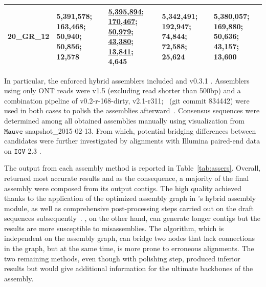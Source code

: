 \begin{landscape}
\begin{table}[!hpt]
\begin{tabular}{cp{4cm}p{4cm}p{4cm}p{4cm}}
20\_GR\_12              & \cellcolor{Gray}\textbf{5,391,578}; \textbf{163,468}; \textbf{50,940}; 50,856; 12,578  & \underline{\textbf{5,395,894}}; \underline{\textbf{170,467}}; \underline{\textbf{50,979}}; \underline{\textbf{43,380}}; \underline{\textbf{13,841}}; 4,645     & \cellcolor{Gray}5,342,491; \textbf{192,947}; 74,844; 72,588; 25,624    & \textbf{5,380,057}; \textbf{169,880}; \textbf{50,636}; \textbf{43,157}; 13,600  \\ \hline
\end{tabular}
\end{table}
\end{landscape}

In particular, the enforced hybrid assemblers included \npscarf{} and \unicycler{} v0.3.1 \cite{Wick2017unicycler}. Assemblers using only ONT reads were \canu{} v1.5 \cite{Koren2017canu} (excluding read shorter than 500bp) and a combination pipeline of \miniasm{} v0.2-r-168-dirty, \minimap{} v2.1-r311; \racon{}~(git commit 834442) were used in both cases to polish the assemblies afterward~\cite{Vaser2017racon}. Consensus sequences were determined among all obtained assemblies manually using visualization from $\mathtt{Mauve}$ \cite{Darling2011mauve} snapshot\_2015-02-13. 
From which, potential bridging differences between candidates were further investigated by alignments with Illumina paired-end data on $\mathtt{IGV}$ 2.3 \cite{Robinson2011IGV,Thorvaldsdottir2013IGV}. 

The output from each assembly method is reported in Table~\ref{tab:assers}. 
Overall, \unicycler{} returned most accurate results and as the consequence, a majority of the final assembly were composed from its output contigs. The high quality achieved thanks to the application of the optimized assembly graph in \unicycler{}'s hybrid assembly module, as well as comprehensive post-processing steps carried out on the draft sequences subsequently~\cite{Wick2017unicycler}. 
\npscarf{}, on the other hand, can generate longer contigs but the results are more susceptible to misassemblies. The algorithm, which is independent on the assembly graph, can bridge two nodes that lack connections in the graph, but at the same time, is more prone to erroneous alignments. 
The two remaining methods, even though with polishing step, produced inferior results but would give additional information for the ultimate backbones of the assembly.


